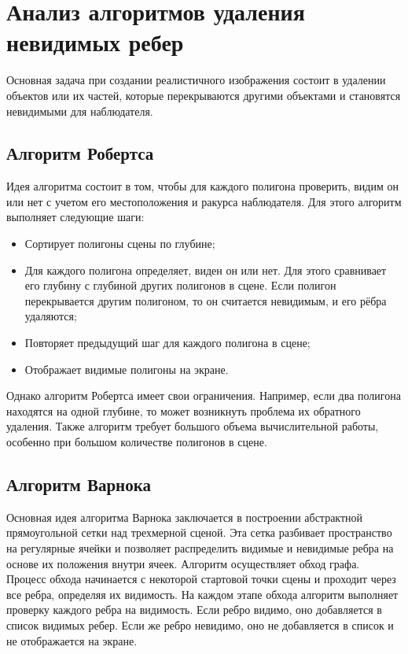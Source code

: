 \section{Анализ алгоритмов удаления невидимых ребер}

Основная задача при создании реалистичного изображения состоит в удалении объектов или их частей, которые перекрываются другими объектами и становятся невидимыми для наблюдателя.


\subsection{Алгоритм Робертса}
Идея алгоритма состоит в том, чтобы для каждого полигона проверить, 
видим он или нет с учетом его местоположения и ракурса наблюдателя\cite{rodgers}. Для 
этого алгоритм выполняет следующие шаги:
\begin{itemize}
	\item  Сортирует полигоны сцены по глубине;
	\item  Для каждого полигона определяет, виден он или нет. Для этого 
	сравнивает его глубину с глубиной других полигонов в сцене. Если полигон 
	перекрывается другим полигоном, то он считается невидимым, и его рёбра 
	удаляются;
	\item Повторяет предыдущий шаг для каждого полигона в сцене;
	\item Отображает видимые полигоны на экране. 
\end{itemize}
Однако алгоритм Робертса имеет свои ограничения. Например, если 
два полигона находятся на одной глубине, то может возникнуть проблема их 
обратного удаления. Также алгоритм требует большого объема 
вычислительной работы, особенно при большом количестве полигонов в 
сцене.

\subsection{Алгоритм Варнока}

Основная идея алгоритма Варнока заключается в построении 
абстрактной прямоугольной сетки над трехмерной сценой\cite{warnok}. Эта сетка 
разбивает пространство на регулярные ячейки и позволяет распределить 
видимые и невидимые ребра на основе их положения внутри ячеек.
Алгоритм осуществляет обход графа. 
Процесс обхода начинается с некоторой стартовой точки сцены и проходит через все ребра, определяя их 
видимость. 
На каждом этапе обхода алгоритм выполняет проверку каждого 
ребра на видимость. Если ребро видимо, оно добавляется в список видимых 
ребер. Если же ребро невидимо, оно не добавляется в список и не 
отображается на экране.


